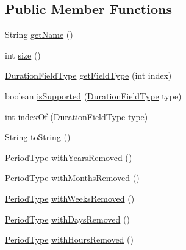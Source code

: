 \subsection*{Public Member Functions}
\begin{DoxyCompactItemize}
\item 
String \hyperlink{classorg_1_1joda_1_1time_1_1_period_type_a2cd985062d1ad5441eae0a38a12d8849}{get\-Name} ()
\item 
int \hyperlink{classorg_1_1joda_1_1time_1_1_period_type_adbe51812b74c4c795b963101bc256cd0}{size} ()
\item 
\hyperlink{classorg_1_1joda_1_1time_1_1_duration_field_type}{Duration\-Field\-Type} \hyperlink{classorg_1_1joda_1_1time_1_1_period_type_aa3d3119a944b4bec9849180ccd7efb60}{get\-Field\-Type} (int index)
\item 
boolean \hyperlink{classorg_1_1joda_1_1time_1_1_period_type_ac3fe52cfaac4fe26f2fd76035dfc1465}{is\-Supported} (\hyperlink{classorg_1_1joda_1_1time_1_1_duration_field_type}{Duration\-Field\-Type} type)
\item 
int \hyperlink{classorg_1_1joda_1_1time_1_1_period_type_ad5a983e93a24cbd927045b90d4d927dd}{index\-Of} (\hyperlink{classorg_1_1joda_1_1time_1_1_duration_field_type}{Duration\-Field\-Type} type)
\item 
String \hyperlink{classorg_1_1joda_1_1time_1_1_period_type_a2ff40a5acc62141769665f63f6e92c53}{to\-String} ()
\item 
\hyperlink{classorg_1_1joda_1_1time_1_1_period_type}{Period\-Type} \hyperlink{classorg_1_1joda_1_1time_1_1_period_type_ad4403df9c668ea22b72583bef47665cc}{with\-Years\-Removed} ()
\item 
\hyperlink{classorg_1_1joda_1_1time_1_1_period_type}{Period\-Type} \hyperlink{classorg_1_1joda_1_1time_1_1_period_type_ad46952451d87754ac46c8d1e0e8ec19e}{with\-Months\-Removed} ()
\item 
\hyperlink{classorg_1_1joda_1_1time_1_1_period_type}{Period\-Type} \hyperlink{classorg_1_1joda_1_1time_1_1_period_type_a3649e8c744e02a8f061377b7d7a7bea5}{with\-Weeks\-Removed} ()
\item 
\hyperlink{classorg_1_1joda_1_1time_1_1_period_type}{Period\-Type} \hyperlink{classorg_1_1joda_1_1time_1_1_period_type_ad9a70e13bd53391f323ca9e02e903b49}{with\-Days\-Removed} ()
\item 
\hyperlink{classorg_1_1joda_1_1time_1_1_period_type}{Period\-Type} \hyperlink{classorg_1_1joda_1_1time_1_1_period_type_ac44f9c99ab079db1e2cdded48f04028d}{with\-Hours\-Removed} ()
\item 

\end{DoxyCompactItemize}
